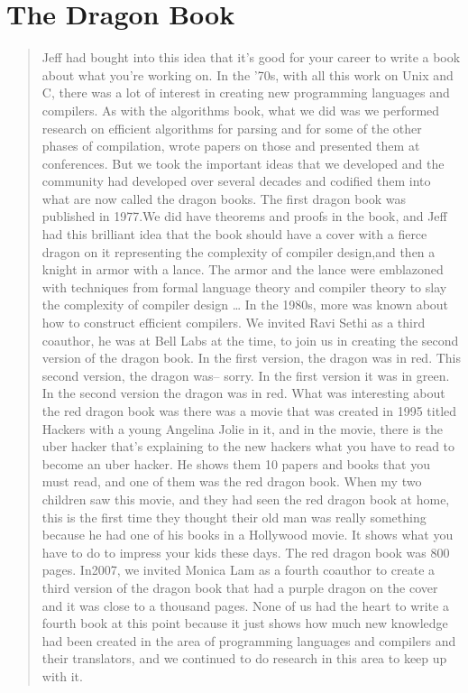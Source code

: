 \section{The Dragon Book}
\begin{quotation}
    Jeff had bought into this idea that it's good for your career to write a 
book about what you're working on. In the '70s, with all this work on Unix and 
C, there was a lot of interest in creating new programming languages and 
compilers. As with the algorithms book, what we did was we performed research 
on efficient algorithms for parsing and for some of the other phases of 
compilation, wrote papers on those  and presented them at conferences. But we 
took the important ideas that we developed and the community had developed over 
several decades and codified them into what are now called the dragon books. The 
first dragon book was published in 1977.We did have theorems and proofs in the 
book, and Jeff had this brilliant idea that the book should have a cover with a 
fierce dragon on it representing the complexity of compiler design,and then a 
knight in armor with a lance. The armor and the lance were emblazoned with 
techniques from formal language theory and compiler theory to slay the 
complexity of compiler design
\dots
In the 1980s, more was known about how to construct efficient compilers. We 
invited Ravi Sethi as a third coauthor, he was at Bell Labs at the time, to join 
us in creating the second version of the dragon book. In the first version, the 
dragon was in red. This second version, the dragon was-- sorry. In the first 
version it was in green. In the second version the dragon was in red. What was 
interesting about the red dragon book was there was a movie that was created in 
1995 titled Hackers with a young Angelina Jolie in it, and in the movie, there 
is the uber hacker that's explaining to the new hackers what you have to read to 
become an uber hacker. He shows them 10 papers and books that you must read, and 
one of them was the red dragon book. When my two children saw this movie, and 
they had seen the red dragon book at home, this is the first time they thought 
their old man was really something because he had one of his books in a 
Hollywood movie. It shows what you have to do to impress your kids these days. 
The red dragon book was 800 pages. In2007, we invited Monica Lam as a fourth 
coauthor to create a third version of the dragon book that had a purple dragon 
on the cover and it was close to a thousand pages. None of us had the heart to 
write a fourth book at this point because it just shows how much new knowledge 
had been created in the area of programming languages and compilers and their 
translators, and we continued to do research in this area to keep up with it.
\cite{aho_oral_history_2022}
\end{quotation}
